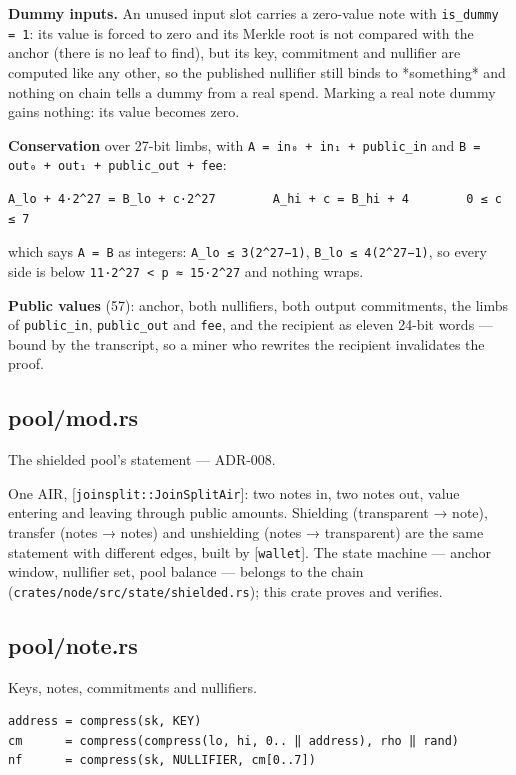 \documentclass[11pt,a4paper]{article}
\begin{document}
\textbf{Dummy inputs.} An unused input slot carries a zero-value note with
\texttt{is\_dummy = 1}: its value is forced to zero and its Merkle root is not
compared with the anchor (there is no leaf to find), but its key,
commitment and nullifier are computed like any other, so the published
nullifier still binds to *something* and nothing on chain tells a dummy
from a real spend. Marking a real note dummy gains nothing: its value
becomes zero.

\textbf{Conservation} over 27-bit limbs, with \texttt{A = in₀ + in₁ + public\_in} and
\texttt{B = out₀ + out₁ + public\_out + fee}:

\begin{verbatim}
A_lo + 4·2^27 = B_lo + c·2^27        A_hi + c = B_hi + 4        0 ≤ c ≤ 7
\end{verbatim}

which says \texttt{A = B} as integers: \texttt{A\_lo ≤ 3(2\textasciicircum{}27−1)}, \texttt{B\_lo ≤ 4(2\textasciicircum{}27−1)}, so
every side is below \texttt{11·2\textasciicircum{}27 < p ≈ 15·2\textasciicircum{}27} and nothing wraps.

\textbf{Public values} (57): anchor, both nullifiers, both output commitments,
the limbs of \texttt{public\_in}, \texttt{public\_out} and \texttt{fee}, and the recipient as
eleven 24-bit words — bound by the transcript, so a miner who rewrites the
recipient invalidates the proof.

\subsection{pool/mod.rs}
The shielded pool's statement — ADR-008.

One AIR, [\texttt{joinsplit::JoinSplitAir}]: two notes in, two notes out, value
entering and leaving through public amounts. Shielding (transparent → note),
transfer (notes → notes) and unshielding (notes → transparent) are the same
statement with different edges, built by [\texttt{wallet}]. The state machine —
anchor window, nullifier set, pool balance — belongs to the chain
(\texttt{crates/node/src/state/shielded.rs}); this crate proves and verifies.

\subsection{pool/note.rs}
Keys, notes, commitments and nullifiers.

\begin{verbatim}
address = compress(sk, KEY)
cm      = compress(compress(lo, hi, 0.. ‖ address), rho ‖ rand)
nf      = compress(sk, NULLIFIER, cm[0..7])
\end{verbatim}
\end{document}

